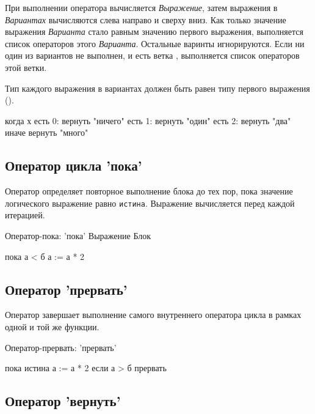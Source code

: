 При выполнении оператора  вычисляется \emph{Выражение},
затем выражения в \emph{Вариантах} вычисляются слева направо и сверху вниз. 
Как только значение выражения \emph{Варианта} стало равным значению первого выражения, выполняется список операторов этого \emph{Варианта}.
Остальные варинты игнорируются.
Если ни один из вариантов не выполнен, и есть ветка , выполняется список операторов этой ветки.

Тип каждого выражения в вариантах должен быть равен типу первого выражения ().

\begin{Trivil}
когда х {
есть 0: вернуть "ничего"
есть 1: вернуть "один"
есть 2: вернуть "два"
иначе вернуть "много"
}
\end{Trivil}


\hypertarget{while-stmt}{%
\subsection{Оператор цикла 'пока' }\label{stmt:while-stmt}}

Оператор  определяет повторное выполнение блока до тех пор, пока значение логического выражение равно \verb+истина+. 
Выражение вычисляется перед каждой итерацией.

\begin{Grammar}
Оператор-пока: 'пока' Выражение Блок 
\end{Grammar}

\begin{Trivil}
пока а < б {
    а := а * 2
}
\end{Trivil}

\hypertarget{break-stmt}{%
\subsection{Оператор 'прервать'}\label{stmt:break-stmt}}

Оператор  завершает выполнение самого внутреннего оператора цикла в рамках одной и той же функции.

\begin{Grammar}
Оператор-прервать: 'прервать' 
\end{Grammar}

\begin{Trivil}
пока истина {
    а := а * 2
    если а > б { прервать }
}
\end{Trivil}

\hypertarget{return-stmt}{%
\subsection{Оператор 'вернуть'}\label{stmt:return-stmt}}

